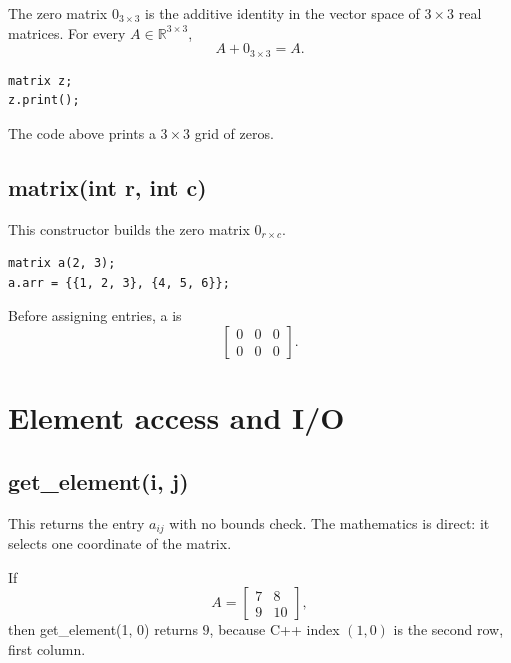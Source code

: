 \documentclass[11pt,a4paper,openany]{book}
\def\code#1{#1}%
\DeclareRobustCommand{\code}[1]{\texttt{\detokenize{#1}}}
\newcommand{\R}{\mathbb{R}}
\begin{document}
\begin{mathbox}
The zero matrix \(0_{3 \times 3}\) is the additive identity in the vector space of \(3 \times 3\) real matrices. For every \(A \in \R^{3 \times 3}\),
\[
A + 0_{3 \times 3} = A.
\]
\end{mathbox}

\begin{lstlisting}[style=eldaCpp,caption={Default constructor example}]
matrix z;
z.print();
\end{lstlisting}

\begin{examplebox}[Example]
The code above prints a \(3 \times 3\) grid of zeros.
\end{examplebox}

\subsection{\code{matrix(int r, int c)}}
This constructor builds the zero matrix \(0_{r \times c}\).

\begin{lstlisting}[style=eldaCpp,caption={Sized constructor example}]
matrix a(2, 3);
a.arr = {{1, 2, 3}, {4, 5, 6}};
\end{lstlisting}

\begin{examplebox}[Example]
Before assigning entries, \code{a} is
\[
\begin{bmatrix}
0 & 0 & 0 \\
0 & 0 & 0
\end{bmatrix}.
\]
\end{examplebox}

\section{Element access and I/O}

\subsection{\code{get_element(i, j)}}
This returns the entry \(a_{ij}\) with no bounds check. The mathematics is direct: it selects one coordinate of the matrix.

\begin{examplebox}[Example]
If
\[
A = \begin{bmatrix}
7 & 8 \\
9 & 10
\end{bmatrix},
\]
then \code{get_element(1, 0)} returns \(9\), because C++ index \((1,0)\) is the second row, first column.
\end{examplebox}
\end{document}
